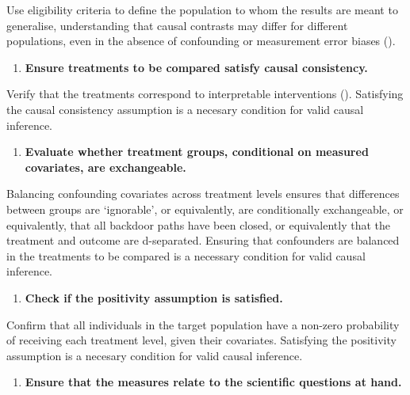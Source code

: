 \documentclass[
  single column]{article}
\providecommand{\tightlist}{%
  \setlength{\itemsep}{0pt}\setlength{\parskip}{0pt}}\usepackage{longtable,booktabs,array}
\begin{document}
Use eligibility criteria to define the population to whom the results
are meant to generalise, understanding that causal contrasts may differ
for different populations, even in the absence of confounding or
measurement error biases ().

\begin{enumerate}
\def\labelenumi{\arabic{enumi}.}
\setcounter{enumi}{3}
\tightlist
\item
  \textbf{Ensure treatments to be compared satisfy causal consistency.}
\end{enumerate}

Verify that the treatments correspond to interpretable interventions
(). Satisfying
the causal consistency assumption is a necesary condition for valid
causal inference.

\begin{enumerate}
\def\labelenumi{\arabic{enumi}.}
\setcounter{enumi}{4}
\tightlist
\item
  \textbf{Evaluate whether treatment groups, conditional on measured
  covariates, are exchangeable.}
\end{enumerate}

Balancing confounding covariates across treatment levels ensures that
differences between groups are `ignorable', or equivalently, are
conditionally exchangeable, or equivalently, that all backdoor paths
have been closed, or equivalently that the treatment and outcome are
d-separated. Ensuring that confounders are balanced in the treatments to
be compared is a necessary condition for valid causal inference.

\begin{enumerate}
\def\labelenumi{\arabic{enumi}.}
\setcounter{enumi}{5}
\tightlist
\item
  \textbf{Check if the positivity assumption is satisfied.}
\end{enumerate}

Confirm that all individuals in the target population have a non-zero
probability of receiving each treatment level, given their covariates.
Satisfying the positivity assumption is a necesary condition for valid
causal inference.

\begin{enumerate}
\def\labelenumi{\arabic{enumi}.}
\setcounter{enumi}{6}
\tightlist
\item
  \textbf{Ensure that the measures relate to the scientific questions at
  hand.}
\end{enumerate}
\end{document}
